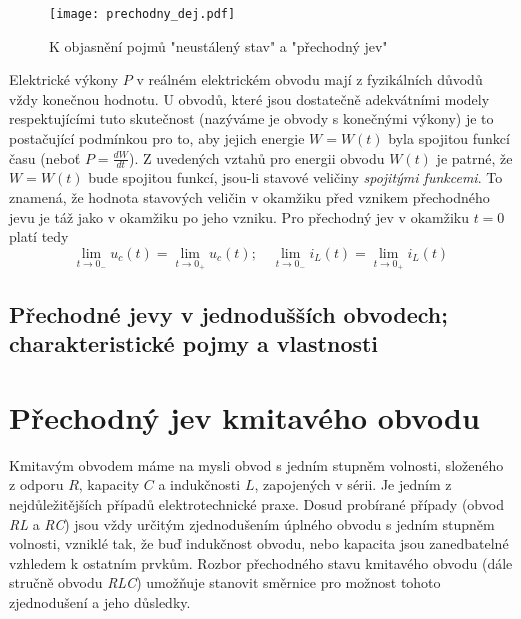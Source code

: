 {    \begin{figure}[ht!]
       \centering
       \texttt{[image: prechodny\_dej.pdf]}
       \caption[Přechodný jev]{K objasnění pojmů "neustálený stav" a "přechodný jev"}
       \label{TEO:fig_prechodny_dej}
    \end{figure}

    Elektrické výkony $P$ v reálném elektrickém obvodu mají z fyzikálních důvodů vždy konečnou 
    hodnotu. U obvodů, které jsou dostatečně adekvátními modely respektujícími tuto skutečnost 
    (nazýváme je obvody s konečnými výkony) je to postačující podmínkou pro to, aby jejich energie 
    $W = W(t)$ byla spojitou funkcí času (neboť $P = \frac{dW}{dt}$). Z uvedených vztahů pro 
    energii obvodu $W(t)$ je patrné, že $W = W(t)$ bude spojitou funkcí, jsou-li stavové veličiny 
    \emph{spojitými funkcemi}. To znamená, že hodnota stavových veličin v okamžiku před vznikem 
    přechodného jevu je táž jako v okamžiku po jeho vzniku. Pro přechodný jev v okamžiku $t=0$ 
    platí tedy
    \begin{equation}\label{TEO:eq_spojite_fce}
      \lim_{t\rightarrow0_-}u_c(t)= \lim_{t\rightarrow0_+}u_c(t); \quad  
      \lim_{t\rightarrow0_-}i_L(t)= \lim_{t\rightarrow0_+}i_L(t)
    \end{equation}

     \subsection{Přechodné jevy v jednodušších obvodech; charakteristické pojmy a vlastnosti}
            

            
  \newpage
  \section{Přechodný jev kmitavého obvodu}
    Kmitavým obvodem máme na mysli obvod s jedním stupněm volnosti, složeného z odporu $R$,
    kapacity $C$ a indukčnosti $L$, zapojených v sérii. Je jedním z nejdůležitějších případů
    elektrotechnické praxe. Dosud probírané případy (obvod \emph{RL} a \emph{RC}) jsou vždy určitým
    zjednodušením úplného obvodu s jedním stupněm volnosti, vzniklé tak, že buď indukčnost obvodu,
    nebo kapacita jsou zanedbatelné vzhledem k ostatním prvkům. Rozbor přechodného stavu kmitavého
    obvodu (dále stručně obvodu \emph{RLC}) umožňuje stanovit směrnice pro možnost tohoto
    zjednodušení a jeho důsledky.

}
